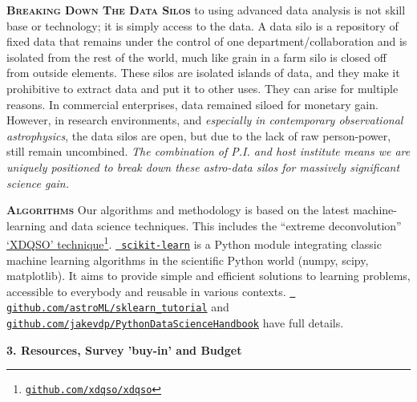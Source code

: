 \documentclass[oneside, a4paper, onecolumn, 11pt]{article}
\begin{document}
\smallskip
\smallskip
\noindent
\textbf{\textsc{Breaking Down The Data Silos}}
to using advanced data analysis is not skill base or technology; it is
simply access to the data.  A data silo is a repository of fixed data
that remains under the control of one department/collaboration and is
isolated from the rest of the world, much like grain in a farm silo is
closed off from outside elements. These silos are isolated islands of
data, and they make it prohibitive to extract data and put it to other
uses. They can arise for multiple reasons. In commercial enterprises,
data remained siloed for monetary gain.  However, in research
environments, and {\it especially in contemporary observational
astrophysics}, the data silos are open, but due to the lack of raw
person-power, still remain uncombined. {\it The combination 
of P.I. and host institute means we are uniquely positioned to 
break down these astro-data silos for massively significant 
science gain.}


\smallskip
\smallskip
\noindent
\textbf{\textsc{Algorithms}}
Our algorithms and methodology is based on the latest machine-learning and data science techniques. 
This includes the ``extreme deconvolution'' \href{http://www.sdss.org/dr14/data\_access/value-added-catalogs/?vac\_id=xdqso/}{`XDQSO' technique}\footnote{\href{https://github.com/xdqso/xdqso}{\tt github.com/xdqso/xdqso}}.
\href{http://ogrisel.github.io/scikit-learn.org/sklearn-tutorial/index.html}{\tt
scikit-learn} is a Python module integrating classic machine learning
algorithms in the scientific Python world (numpy, scipy,
matplotlib). It aims to provide simple and efficient solutions to
learning problems, accessible to everybody and reusable in various
contexts.  \href{https://github.com/astroML/sklearn\_tutorial}{{\tt
github.com/astroML/sklearn\_tutorial}} and \href{https://github.com/jakevdp/PythonDataScienceHandbook}{{\tt github.com/jakevdp/PythonDataScienceHandbook}} have full details.



\smallskip
\smallskip
\noindent
\large
{\bf{\textcolor{Cerulean}{3. Resources,  Survey 'buy-in' and Budget}}}
\normalsize
\end{document}
